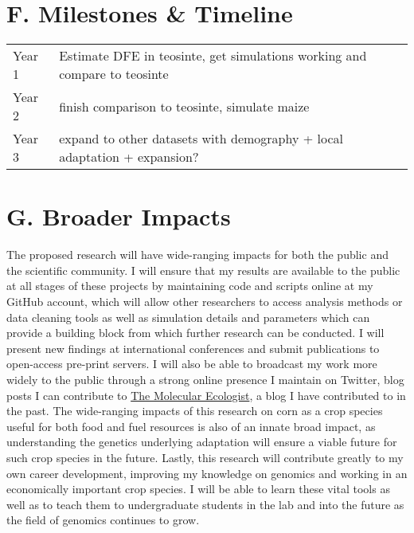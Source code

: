 \section*{F. Milestones \& Timeline}
\begin{tabular}{ll}
Year 1 \hspace{0.5in} & Estimate DFE in teosinte, get simulations working and compare to teosinte \\
Year 2                     & finish comparison to teosinte, simulate maize \\
Year 3		& expand to other datasets with demography + local adaptation + expansion? \\
\end{tabular}
  

\section*{G. Broader Impacts}

The proposed research will have wide-ranging impacts for both the public and the scientific community. I will ensure that my results are available to the public at all stages of these projects by maintaining code and scripts online at my GitHub account, which will allow other researchers to access analysis methods or data cleaning tools as well as simulation details and parameters which can provide a building block from which further research can be conducted. I will present new findings at international conferences and submit publications to open-access pre-print servers. I will also be able to broadcast my work more widely to the public through a strong online presence I maintain on Twitter, blog posts I can contribute to \href{http://www.molecularecologist.com/}{The Molecular Ecologist}, a blog I have contributed to in the past. The wide-ranging impacts of this research on corn as a crop species useful for both food and fuel resources is also of an innate broad impact, as understanding the genetics underlying adaptation will ensure a viable future for such crop species in the future. Lastly, this research will contribute greatly to my own career development, improving my knowledge on genomics and working in an economically important crop species. I will be able to learn these vital tools as well as to teach them to undergraduate students in the lab and into the future as the field of genomics continues to grow.


